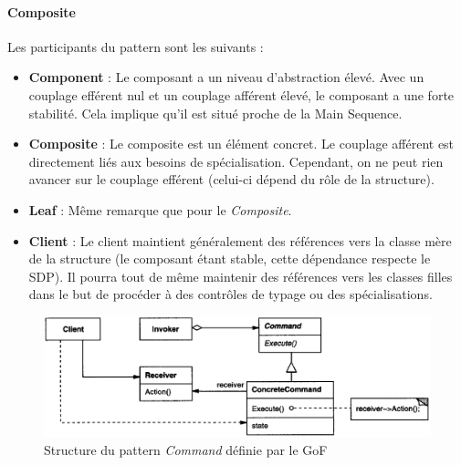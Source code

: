 \documentclass{scrartcl}
\begin{document}
    \paragraph{Composite}Les participants du pattern sont les suivants :
    \begin{itemize}
        \item \textbf{Component} : Le composant a un niveau d'abstraction élevé. Avec un couplage efférent nul et un couplage afférent élevé, le composant a une forte stabilité. Cela implique qu'il est situé proche de la Main Sequence.
        \item \textbf{Composite} : Le composite est un élément concret. Le couplage afférent est directement liés aux besoins de spécialisation. Cependant, on ne peut rien avancer sur le couplage efférent (celui-ci dépend du rôle de la structure).
        \item \textbf{Leaf} : Même remarque que pour le \emph{Composite}.
        \item \textbf{Client} : Le client maintient généralement des références vers la classe mère de la structure (le composant étant stable, cette dépendance respecte le SDP). Il pourra tout de même maintenir des références vers les classes filles dans le but de procéder à des contrôles de typage ou des spécialisations.
    \end{itemize}
    

    \bigbreak
    \begin{figure}[H]
        \centering
        \includegraphics[scale=0.35]{img/pattern/command.png}
        \caption{Structure du pattern \emph{Command} définie par le GoF}
    \end{figure}
\end{document}

